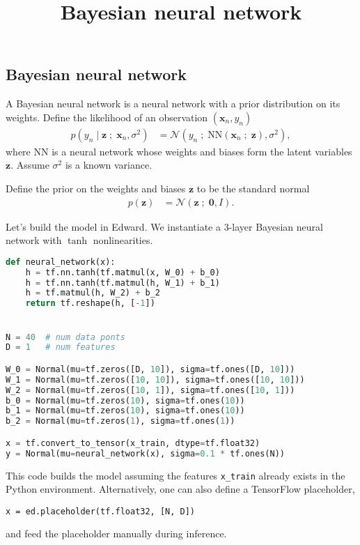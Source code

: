 \title{Bayesian neural network}

\subsection{Bayesian neural network}

A Bayesian neural network is a neural network with a prior
distribution on its weights.
Define the likelihood of an observation $(\mathbf{x}_n, y_n)$
\begin{align*}
  p(y_n \mid \mathbf{z} \;;\; \mathbf{x}_n, \sigma^2)
  &=
  \mathcal{N}(y_n \;;\; \mathrm{NN}(\mathbf{x}_n\;;\;\mathbf{z}), \sigma^2),
\end{align*}
where $\mathrm{NN}$ is a neural network whose weights and biases form
the latent variables $\mathbf{z}$. Assume $\sigma^2$ is a
known variance.

Define the prior on the weights and biases $\mathbf{z}$ to be the standard normal
\begin{align*}
  p(\mathbf{z})
  &=
  \mathcal{N}(\mathbf{z} \;;\; \mathbf{0}, I).
\end{align*}

Let's build the model in Edward. We
instantiate a 3-layer Bayesian neural network with $\tanh$
nonlinearities.
\begin{lstlisting}[language=Python]
def neural_network(x):
    h = tf.nn.tanh(tf.matmul(x, W_0) + b_0)
    h = tf.nn.tanh(tf.matmul(h, W_1) + b_1)
    h = tf.matmul(h, W_2) + b_2
    return tf.reshape(h, [-1])


N = 40  # num data ponts
D = 1   # num features

W_0 = Normal(mu=tf.zeros([D, 10]), sigma=tf.ones([D, 10]))
W_1 = Normal(mu=tf.zeros([10, 10]), sigma=tf.ones([10, 10]))
W_2 = Normal(mu=tf.zeros([10, 1]), sigma=tf.ones([10, 1]))
b_0 = Normal(mu=tf.zeros(10), sigma=tf.ones(10))
b_1 = Normal(mu=tf.zeros(10), sigma=tf.ones(10))
b_2 = Normal(mu=tf.zeros(1), sigma=tf.ones(1))

x = tf.convert_to_tensor(x_train, dtype=tf.float32)
y = Normal(mu=neural_network(x), sigma=0.1 * tf.ones(N))
\end{lstlisting}
This code builds the model assuming the features \texttt{x\_train}
already exists in the Python environment. Alternatively, one can also
define a TensorFlow placeholder,
\begin{lstlisting}
x = ed.placeholder(tf.float32, [N, D])
\end{lstlisting}
and feed the placeholder manually during inference.

